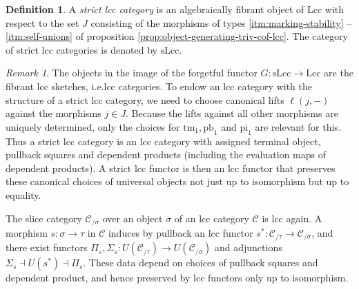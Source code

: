 \documentclass[a4paper]{article}
\theoremstyle{remark}
\newtheorem{remark}[theorem]{Remark}
\theoremstyle{definition}
\newtheorem{definition}[theorem]{Definition}
\begin{document}
\begin{definition}
  A \emph{strict lcc category} is an algebraically fibrant object of $\mathrm{Lcc}$ with respect to the set $J$ consisting of the morphisms of types \ref{itm:marking-stability} -- \ref{itm:self-unions} of proposition \ref{prop:object-generating-triv-cof-lcc}.
  The category of strict lcc categories is denoted by $\mathrm{sLcc}$.
\end{definition}

\begin{remark}
  The objects in the image of the forgetful functor $G : \mathrm{sLcc} \rightarrow \mathrm{Lcc}$ are the fibrant lcc sketches, i.e.\@ lcc categories.
  To endow an lcc category with the structure of a strict lcc category, we need to choose canonical lifts $\ell(j, -)$ against the morphisms $j \in J$.
  Because the lifts against all other morphisms are uniquely determined, only the choices for $\mathrm{tm}_1, \mathrm{pb}_1$ and $\mathrm{pi}_1$ are relevant for this.
  Thus a strict lcc category is an lcc category with assigned terminal object, pullback squares and dependent products (including the evaluation maps of dependent products).
  A strict lcc functor is then an lcc functor that preserves these canonical choices of universal objects not just up to isomorphism but up to equality.
\end{remark}

The slice category $\mathcal{C}_{/ \sigma}$ over an object $\sigma$ of an lcc category $\mathcal{C}$ is lcc again.
A morphism $s : \sigma \rightarrow \tau$ in $\mathcal{C}$ induces by pullback an lcc functor $s^* : \mathcal{C}_{/ \tau} \rightarrow \mathcal{C}_{/ \sigma}$, and there exist functors $\Pi_s, \Sigma_s : U(\mathcal{C}_{/ \tau}) \rightarrow U(\mathcal{C}_{/ \sigma})$ and adjunctions $\Sigma_s \dashv U(s^*) \dashv \Pi_s$.
These data depend on choices of pullback squares and dependent product, and hence preserved by lcc functors only up to isomorphism.
\end{document}
